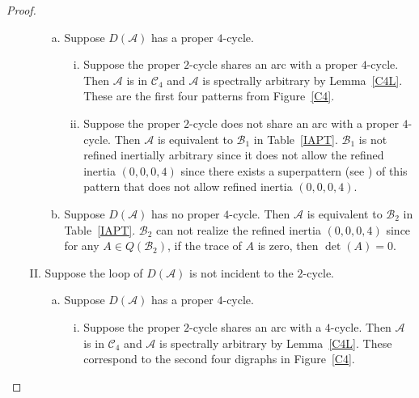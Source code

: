 \documentclass[10pt]{amsart}
\begin{document}
\begin{proof}
\begin{enumerate}[(A)]
\begin{enumerate}[(I)]
\begin{enumerate}[(a)]
				\item Suppose $D({\mathcal{A}})$ has a proper $4$-cycle. 
				\begin{enumerate}[(i)]
					\item Suppose the proper $2$-cycle shares an arc with a proper $4$-cycle. Then ${\mathcal{A}}$ is in ${\mathscr{C}}_4$ and
				${\mathcal{A}}$ is spectrally arbitrary by Lemma~\ref{C4L}. These are the first four patterns from Figure~\ref{C4}. 
					\item Suppose the proper $2$-cycle does not share an arc with a proper $4$-cycle. Then 
					${\mathcal{A}}$ is equivalent to ${\mathcal{B}}_1$ in Table~\ref{IAPT}.  
					${\mathcal{B}}_1$ is not refined inertially arbitrary since it does not allow the
					 refined inertia $(0,0,0,4)$ since there exists a superpattern (see \cite[Example 2.16]{CF}) 
					 of this pattern that does not  allow refined inertia $(0,0,0,4)$. 
				\end{enumerate}
				\item Suppose $D({\mathcal{A}})$ has no proper $4$-cycle. Then ${\mathcal{A}}$ is equivalent to ${\mathcal{B}}_2$
				in Table~\ref{IAPT}.   
				${\mathcal{B}}_2$ can not realize the refined inertia $(0,0,0,4)$ 
				since for any $A\in Q({\mathcal{B}}_2)$, if the trace of $A$ is zero, then $\det(A)=0$.		 
			\end{enumerate}
			\item Suppose the loop of $D({\mathcal{A}})$ is not incident to the $2$-cycle. 
			\begin{enumerate}[(a)]
				\item Suppose $D({\mathcal{A}})$ has  a proper $4$-cycle. 
				\begin{enumerate}[(i)]
					\item Suppose the proper $2$-cycle shares an arc with a $4$-cycle. Then ${\mathcal{A}}$ is in ${\mathscr{C}}_4$ and
				${\mathcal{A}}$ is spectrally arbitrary by Lemma~\ref{C4L}. These correspond to the second four digraphs in Figure~\ref{C4}. 
					

\end{enumerate}
\end{enumerate}
\end{enumerate}
\end{enumerate}
\end{proof}
\end{document}
